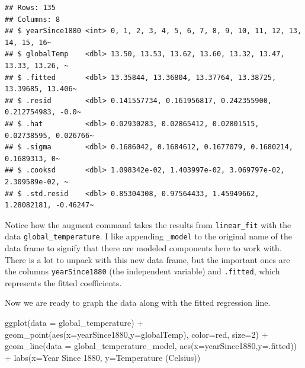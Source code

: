 \documentclass[
]{book}
\newenvironment{Shaded}{\begin{snugshade}}{\end{snugshade}}
\newcommand{\AttributeTok}[1]{\textcolor[rgb]{0.77,0.63,0.00}{#1}}
\newcommand{\DecValTok}[1]{\textcolor[rgb]{0.00,0.00,0.81}{#1}}
\newcommand{\FunctionTok}[1]{\textcolor[rgb]{0.00,0.00,0.00}{#1}}
\newcommand{\NormalTok}[1]{#1}
\newcommand{\SpecialCharTok}[1]{\textcolor[rgb]{0.00,0.00,0.00}{#1}}
\newcommand{\StringTok}[1]{\textcolor[rgb]{0.31,0.60,0.02}{#1}}
\theoremstyle{definition}
\theoremstyle{definition}
\theoremstyle{definition}
\theoremstyle{remark}
\begin{document}
\begin{verbatim}
## Rows: 135
## Columns: 8
## $ yearSince1880 <int> 0, 1, 2, 3, 4, 5, 6, 7, 8, 9, 10, 11, 12, 13, 14, 15, 16~
## $ globalTemp    <dbl> 13.50, 13.53, 13.62, 13.60, 13.32, 13.47, 13.33, 13.26, ~
## $ .fitted       <dbl> 13.35844, 13.36804, 13.37764, 13.38725, 13.39685, 13.406~
## $ .resid        <dbl> 0.141557734, 0.161956817, 0.242355900, 0.212754983, -0.0~
## $ .hat          <dbl> 0.02930283, 0.02865412, 0.02801515, 0.02738595, 0.026766~
## $ .sigma        <dbl> 0.1686042, 0.1684612, 0.1677079, 0.1680214, 0.1689313, 0~
## $ .cooksd       <dbl> 1.098342e-02, 1.403997e-02, 3.069797e-02, 2.309589e-02, ~
## $ .std.resid    <dbl> 0.85304308, 0.97564433, 1.45949662, 1.28082181, -0.46247~
\end{verbatim}

Notice how the augment command takes the results from \texttt{linear\_fit} with the data \texttt{global\_temperature}. I like appending \texttt{\_model} to the original name of the data frame to signify that there are modeled components here to work with. There is a lot to unpack with this new data frame, but the important ones are the columns \texttt{yearSince1880} (the independent variable) and \texttt{.fitted}, which represents the fitted coefficients.

Now we are ready to graph the data along with the fitted regression line.

\begin{Shaded}
\begin{Highlighting}[]
\FunctionTok{ggplot}\NormalTok{(}\AttributeTok{data =}\NormalTok{ global\_temperature) }\SpecialCharTok{+}
  \FunctionTok{geom\_point}\NormalTok{(}\FunctionTok{aes}\NormalTok{(}\AttributeTok{x=}\NormalTok{yearSince1880,}\AttributeTok{y=}\NormalTok{globalTemp),}
             \AttributeTok{color=}\StringTok{\textquotesingle{}red\textquotesingle{}}\NormalTok{,}
             \AttributeTok{size=}\DecValTok{2}\NormalTok{) }\SpecialCharTok{+}
  \FunctionTok{geom\_line}\NormalTok{(}\AttributeTok{data =}\NormalTok{ global\_temperature\_model,}
            \FunctionTok{aes}\NormalTok{(}\AttributeTok{x=}\NormalTok{yearSince1880,}\AttributeTok{y=}\NormalTok{.fitted)) }\SpecialCharTok{+}
  \FunctionTok{labs}\NormalTok{(}\AttributeTok{x=}\StringTok{\textquotesingle{}Year Since 1880\textquotesingle{}}\NormalTok{,}
         \AttributeTok{y=}\StringTok{\textquotesingle{}Temperature (Celsius)\textquotesingle{}}\NormalTok{)}
\end{Highlighting}
\end{Shaded}
\end{document}
